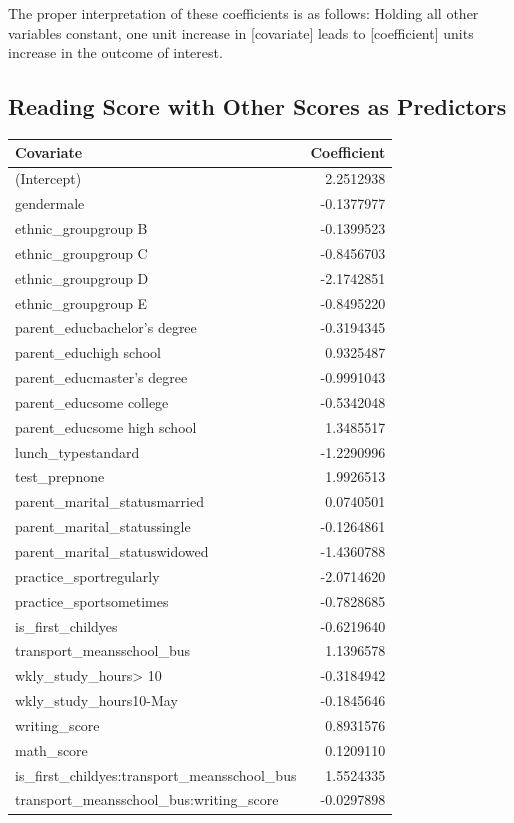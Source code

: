 \documentclass[
]{article}
\begin{document}
The proper interpretation of these coefficients is as follows: Holding
all other variables constant, one unit increase in {[}covariate{]} leads
to {[}coefficient{]} units increase in the outcome of interest.

\subsection{Reading Score with Other Scores as
Predictors}\label{reading-score-with-other-scores-as-predictors}

\begin{longtable}[]{@{}lr@{}}
\toprule\noalign{}
Covariate & Coefficient \\
\midrule\noalign{}
\endhead
\bottomrule\noalign{}
\endlastfoot
(Intercept) & 2.2512938 \\
gendermale & -0.1377977 \\
ethnic\_groupgroup B & -0.1399523 \\
ethnic\_groupgroup C & -0.8456703 \\
ethnic\_groupgroup D & -2.1742851 \\
ethnic\_groupgroup E & -0.8495220 \\
parent\_educbachelor's degree & -0.3194345 \\
parent\_educhigh school & 0.9325487 \\
parent\_educmaster's degree & -0.9991043 \\
parent\_educsome college & -0.5342048 \\
parent\_educsome high school & 1.3485517 \\
lunch\_typestandard & -1.2290996 \\
test\_prepnone & 1.9926513 \\
parent\_marital\_statusmarried & 0.0740501 \\
parent\_marital\_statussingle & -0.1264861 \\
parent\_marital\_statuswidowed & -1.4360788 \\
practice\_sportregularly & -2.0714620 \\
practice\_sportsometimes & -0.7828685 \\
is\_first\_childyes & -0.6219640 \\
transport\_meansschool\_bus & 1.1396578 \\
wkly\_study\_hours\textgreater{} 10 & -0.3184942 \\
wkly\_study\_hours10-May & -0.1845646 \\
writing\_score & 0.8931576 \\
math\_score & 0.1209110 \\
is\_first\_childyes:transport\_meansschool\_bus & 1.5524335 \\
transport\_meansschool\_bus:writing\_score & -0.0297898 \\
\end{longtable}
\end{document}
